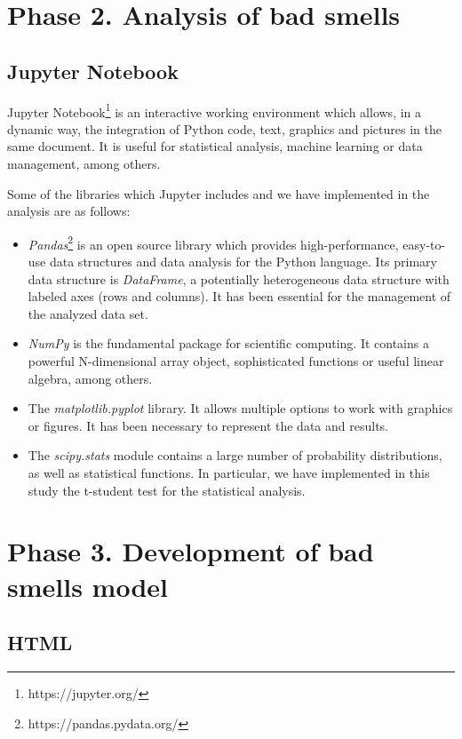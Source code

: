 \section{Phase 2. Analysis of bad smells}
\label{sec:phase_2}

\subsection{Jupyter Notebook}
\label{subsec:jupyter}

Jupyter Notebook\footnote{https://jupyter.org/} is an interactive working environment which allows, in a dynamic way, the integration of Python code, text, graphics and pictures in the same document. It is useful for statistical analysis, machine learning or data management, among others.

Some of the libraries which Jupyter includes and we have implemented in the analysis are as follows:

\begin{itemize}
    \item \textit{Pandas}\footnote{https://pandas.pydata.org/} is an open source library which provides high-performance, easy-to-use data structures and data analysis for the Python language. Its primary data structure is \textit{DataFrame}, a potentially heterogeneous data structure with labeled axes (rows and columns). It has been essential for the management of the analyzed data set.
    \item \textit{NumPy} is the fundamental package for scientific computing. It contains a powerful N-dimensional array object, sophisticated functions or useful linear algebra, among others.
    \item The \textit{matplotlib.pyplot} library. It allows multiple options to work with graphics or figures. It has been necessary to represent the data and results.
    \item The \textit{scipy.stats} module contains a large number of probability distributions, as well as statistical functions. In particular, we have implemented in this study the t-student test for the statistical analysis. 
\end{itemize}



\section{Phase 3. Development of bad smells model}
\label{sec:phase_3}

\subsection{HTML}
\label{subsec:html}

